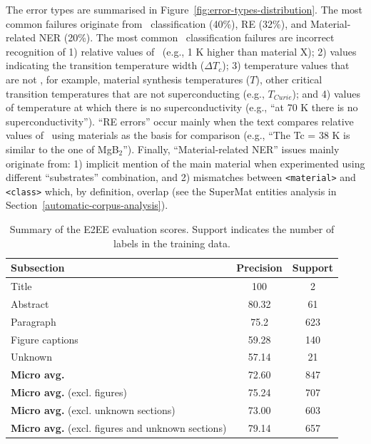 The error types are summarised in Figure~\ref{fig:error-types-distribution}. The most common failures originate from \tc~classification (40\%), RE (32\%), and Material-related NER (20\%).
The most common \tc~classification failures are incorrect recognition of 1) relative values of \tc~(e.g., 1 K higher than material X); 2) values indicating the transition temperature width ($\Delta T_{c}$); 3) temperature values that are not \tc, for example, material synthesis temperatures ($T$), other critical transition temperatures that are not superconducting (e.g., $T_{Curie}$); and 4) values of temperature at which there is no superconductivity (e.g., ``at 70 K there is no superconductivity'').
``RE errors'' occur mainly when the text compares relative values of \tc~using materials as the basis for comparison (e.g., ``The Tc = 38 K is similar to the one of MgB$_{2}$'').
Finally, ``Material-related NER'' issues mainly originate from: 1) implicit mention of the main material when experimented using different ``substrates'' combination, and 2) mismatches between \texttt{<material>} and \texttt{<class>} which, by definition, overlap (see the SuperMat entities analysis in Section~\ref{automatic-corpus-analysis}).


\begin{table}[htbp]
    \centering
    \caption{Summary of the E2EE evaluation scores. Support indicates the number of labels in the training data.}
    \begin{tabular}{l c c}
        \toprule
        \textbf{Subsection}                                      & \textbf{Precision} & \textbf{Support} \\
        \midrule
        Title                                                    & 100                & 2                \\
        Abstract                                                 & 80.32              & 61               \\
        Paragraph                                                & 75.2               & 623              \\
        Figure captions                                          & 59.28              & 140              \\
        Unknown                                                  & 57.14              & 21               \\
        \midrule
        \textbf{Micro avg.}                                      & 72.60              & 847              \\
        \textbf{Micro avg.} (excl. figures)                      & 75.24              & 707              \\
        \textbf{Micro avg.} (excl. unknown sections)             & 73.00              & 603              \\
        \textbf{Micro avg.} (excl. figures and unknown sections) & 79.14              & 657              \\
        \bottomrule
    \end{tabular}
    
    \label{table:end2end-evaluation-summary}
\end{table}

